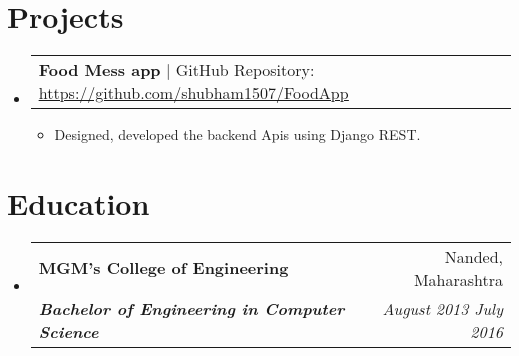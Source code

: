 \documentclass[letterpaper, 11pt]{article}
\makeatletter
\newcommand{\resumeItem}[1]{
    \item \small {
        {#1 \vspace{-3pt}}
    }
}
\newcommand{\resumeSubheading}[4]{
  \vspace{-2pt}\item
    \begin{tabular*}{0.99\textwidth}[t]{l@{\extracolsep{\fill}}r}
      \textbf{#1} & #2 \\
      \textit{\small#3} & \textit{\small #4} \\
    \end{tabular*}\vspace{-7pt}
}
\newcommand{\resumeProjectHeading}[2]{
    \item
    \begin{tabular*}{0.99\textwidth}{l@{\extracolsep{\fill}}r}
      \small#1 & \textit{#2}\\
    \end{tabular*}\vspace{-7pt}
}
\newcommand{\resumeItemListStart}{\begin{itemize}[leftmargin=0.25in, label={\textbullet}]}
\newcommand{\resumeItemListEnd}{\end{itemize}\vspace{-10pt}}
\newcommand{\resumeSubHeadingListStart}{\begin{itemize}[leftmargin=0.15in, label={}]}
\newcommand{\resumeSubHeadingListEnd}{\end{itemize}}
\makeatother
\begin{document}
\section{Projects}
\resumeSubHeadingListStart{}
    \resumeProjectHeading{\textbf{Food Mess app} $|$ GitHub Repository: \underline{\url{https://github.com/shubham1507/FoodApp}}}{}
    \vspace{10pt}
        \resumeItemListStart{}
            \resumeItem{Designed, developed the backend Apis using Django REST.}
        \resumeItemListEnd{}
\resumeSubHeadingListEnd{}

\vspace{-17pt}

\section{Education}
\resumeSubHeadingListStart{}
    \resumeSubheading{MGM's \textendash{} College of Engineering}{Nanded, Maharashtra}
        {\textbf{Bachelor of Engineering in Computer Science}}{August 2013 \textendash{} July 2016}
\resumeSubHeadingListEnd{}

\end{document}
